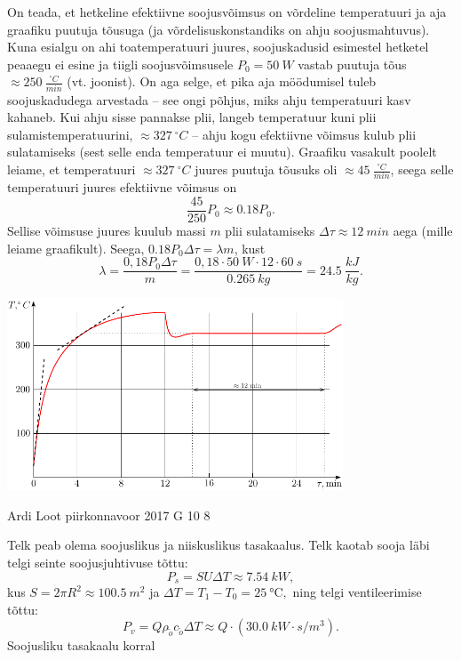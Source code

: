 \documentclass[11pt]{article}
\begin{document}
{{\ifSolution
On teada, et hetkeline efektiivne soojusvõimsus on võrdeline temperatuuri ja aja graafiku puutuja tõusuga (ja võrdelisuskonstandiks on ahju soojusmahtuvus). Kuna esialgu on ahi toatemperatuuri juures, soojuskadusid esimestel hetketel peaaegu ei esine ja tiigli soojusvõimsusele $P_0 = \SI{50}{W}$ vastab puutuja tõus $\approx \SI{250}{\frac{^{\circ}C} {min}}$ (vt. joonist). On aga selge, et pika aja möödumisel tuleb soojuskadudega arvestada -- see ongi põhjus, miks ahju temperatuuri kasv kahaneb. Kui ahju sisse pannakse plii, langeb temperatuur kuni plii sulamistemperatuurini, $\approx \SI{327}{^\circ C}$ -- ahju kogu efektiivne võimsus kulub plii sulatamiseks (sest selle enda temperatuur ei muutu). Graafiku vasakult poolelt leiame, et temperatuuri $\approx \SI{327}{^\circ C}$ juures puutuja tõusuks oli $\approx \SI{45}{\frac{^{\circ}C} {min}}$, seega selle temperatuuri juures efektiivne võimsus on
\[
\frac{45}{250}P_0 \approx \num{0.18}P_0.
\]
Sellise võimsuse juures kuulub massi $m$ plii sulatamiseks $\Delta\tau \approx \SI{12}{min}$ aega (mille leiame graafikult). Seega, $\num{0.18} P_0 \Delta\tau = \lambda m$, kust
\[
\lambda = \frac{0,18 P_0 \Delta \tau}{ m} = \frac{0,18 \cdot \SI{50}{W} \cdot 12 \cdot \SI{60}{s}}{\SI{0.265}{kg}} = \SI{24.5}{\frac{kJ}{kg}}.
\]
\begin{center}
\includegraphics[width = 0.75\textwidth]{2012-v3g-07-ahi_lah}
\end{center}
\fi
}

{Ardi Loot} %
{piirkonnavoor} %
{2017} %
{G 10} %
{8} %
{

\ifSolution
Telk peab olema soojuslikus ja niiskuslikus tasakaalus. Telk kaotab
sooja läbi telgi seinte soojusjuhtivuse tõttu:
\[
P_{s}=SU\Delta T\approx\SI{7.54}{kW},
\]
kus $S=2\pi R^{2}\approx\SI{100.5}{m^{2}}$
ja $\Delta T=T_{1}-T_{0}=\SI{25}{\celsius},$ ning telgi ventileerimise tõttu:
\[
P_{v}=Q\rho_{\tilde{o}}c_{\tilde{o}}\Delta T\approx Q\cdot\left(\SI{30.0}{kW\cdot s/m^{3}}\right).
\]
Soojusliku tasakaalu korral

}}
\end{document}
